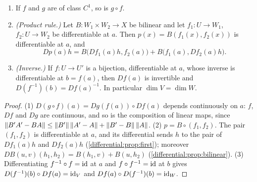 \begin{notechapter}
\begin{corollary}\label{chain-rule-autodiff:cor:consequences}
\begin{enumerate}[nosep]
  \item If $f$ and $g$ are of class $C^1$, so is $g\circ f$.
  \item \emph{(Product rule.)} Let $B:W_1\times W_2\to X$ be bilinear and
        let $f_1:U\to W_1$, $f_2:U\to W_2$ be differentiable at $a$. Then
        $p(x) = B(f_1(x), f_2(x))$ is differentiable at $a$, and
        \[
          Dp(a)h = B\bigl(Df_1(a)h, f_2(a)\bigr)
                 + B\bigl(f_1(a), Df_2(a)h\bigr) .
        \]
  \item \emph{(Inverse.)} If $f:U\to U'$ is a bijection, differentiable at
        $a$, whose inverse is differentiable at $b = f(a)$, then $Df(a)$
        is invertible and $D(f^{-1})(b) = Df(a)^{-1}$. In particular
        $\dim V = \dim W$.
\end{enumerate}
\end{corollary}

\begin{proof}
(1) $D(g\circ f)(a) = Dg(f(a))\circ Df(a)$ depends continuously on $a$:
$f$, $Df$ and $Dg$ are continuous, and so is the composition of linear
maps, since
$\left\|B'A' - BA\right\|\leq\left\|B'\right\|\left\|A' - A\right\| + \left\|B' - B\right\|\left\|A\right\|$.
(2) $p = B\circ(f_1, f_2)$. The pair $(f_1, f_2)$ is differentiable at
$a$, and its differential sends $h$ to the pair of $Df_1(a)h$ and
$Df_2(a)h$ (\cref{differential:prop:first}); moreover
$DB(u, v)(h_1, h_2) = B(h_1, v) + B(u, h_2)$
(\cref{differential:prop:bilinear}). (3) Differentiating
$f^{-1}\circ f = \mathrm{id}$ at $a$ and $f\circ f^{-1} = \mathrm{id}$ at $b$ gives
$D(f^{-1})(b)\circ Df(a) = \mathrm{id}_V$ and
$Df(a)\circ D(f^{-1})(b) = \mathrm{id}_W$.
\end{proof}


\end{notechapter}
